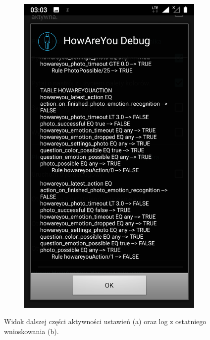 \begin{figure}[H]
\begin{subfigure}{0.35\textwidth}
	\includegraphics[scale=0.13]{rozdzial3/Ustawienia_logZWnioskowania.png}
	\subcaption{\label{subfigure_b}}
\end{subfigure}
\caption{ Widok dalszej części aktywności ustawień (a) oraz log z ostatniego wnioskowania (b).}
\end{figure}

